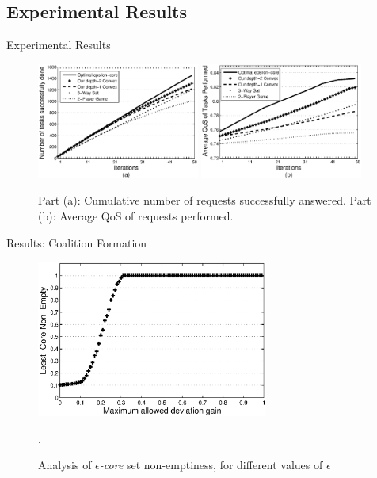 \documentclass{beamer}
\begin{document}
\subsection{Experimental Results}
\begin{frame}{Experimental Results}

    \begin{figure}[!t]
    \centering
    \includegraphics[width=2.1in]{figures/task_done_opt.eps}
    \includegraphics[width=2.1in]{figures/task_qos_opt.eps}
    \caption{Part (a): Cumulative number of requests successfully
    answered. Part (b): Average QoS of requests performed.}
    \label{performanceall}
    \end{figure}

\end{frame}

\begin{frame}{Results: Coalition Formation}
    \begin{figure}[!t]
        \centering
        \includegraphics[width=3in]{figures/least_core.eps}
        \caption{Analysis of \emph{$\epsilon$-core} set non-emptiness, for different values of $\epsilon$}. \label{f_leastcore}
    \end{figure}
\end{frame}
\end{document}
